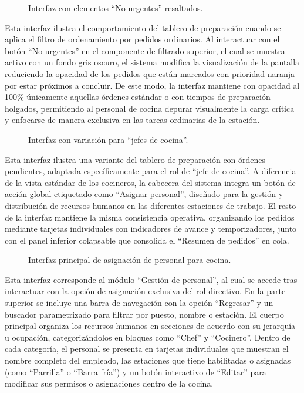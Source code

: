 \begin{figure}[H]
    \centering
    
    \caption{Interfaz con elementos ``No urgentes'' resaltados.}
    \label{fig:ui-coc-02-no-urgentes}
\end{figure}

Esta interfaz ilustra el comportamiento del tablero de preparación cuando se aplica el filtro de ordenamiento por pedidos ordinarios. Al interactuar con el botón ``No urgentes'' en el componente de filtrado superior, el cual se muestra activo con un fondo gris oscuro, el sistema modifica la visualización de la pantalla reduciendo la opacidad de los pedidos que están marcados con prioridad naranja por estar próximos a concluir. De este modo, la interfaz mantiene con opacidad al 100\% únicamente aquellas órdenes estándar o con tiempos de preparación holgados, permitiendo al personal de cocina depurar visualmente la carga crítica y enfocarse de manera exclusiva en las tareas ordinarias de la estación.

\begin{figure}[H]
    \centering
    
    \caption{Interfaz con variación para ``jefes de cocina''.}
    \label{fig:ui-coc-02-b}
\end{figure}

Esta interfaz ilustra una variante del tablero de preparación con órdenes pendientes, adaptada específicamente para el rol de ``jefe de cocina''. A diferencia de la vista estándar de los cocineros, la cabecera del sistema integra un botón de acción global etiquetado como ``Asignar personal'', diseñado para la gestión y distribución de recursos humanos en las diferentes estaciones de trabajo. El resto de la interfaz mantiene la misma consistencia operativa, organizando los pedidos mediante tarjetas individuales con indicadores de avance y temporizadores, junto con el panel inferior colapsable que consolida el ``Resumen de pedidos'' en cola.

\begin{figure}[H]
    \centering
    
    \caption{Interfaz principal de asignación de personal para cocina.}
    \label{fig:ui-coc-03}
\end{figure}

Esta interfaz corresponde al módulo ``Gestión de personal'', al cual se accede tras interactuar con la opción de asignación exclusiva del rol directivo. En la parte superior se incluye una barra de navegación con la opción ``Regresar'' y un buscador parametrizado para filtrar por puesto, nombre o estación. El cuerpo principal organiza los recursos humanos en secciones de acuerdo con su jerarquía u ocupación, categorizándolos en bloques como ``Chef'' y ``Cocinero''. Dentro de cada categoría, el personal se presenta en tarjetas individuales que muestran el nombre completo del empleado, las estaciones que tiene habilitadas o asignadas (como ``Parrilla'' o ``Barra fría'') y un botón interactivo de ``Editar'' para modificar sus permisos o asignaciones dentro de la cocina.

